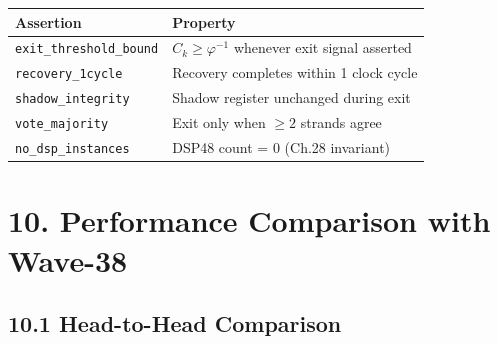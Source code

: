 \begin{longtable}[]{@{}
  >{\raggedright\arraybackslash}p{}
  >{\raggedright\arraybackslash}p{}@{}}
\toprule\noalign{}
Assertion & Property \\
\midrule\noalign{}
\endhead
\bottomrule\noalign{}
\endlastfoot
\texttt{exit\_threshold\_bound} & \(C_k \ge \varphi^{-1}\) whenever exit signal asserted \\
\texttt{recovery\_1cycle} & Recovery completes within 1 clock cycle \\
\texttt{shadow\_integrity} & Shadow register unchanged during exit \\
\texttt{vote\_majority} & Exit only when \(\ge 2\) strands agree \\
\texttt{no\_dsp\_instances} & DSP48 count = 0 (Ch.28 invariant) \\
\end{longtable}

\section{10. Performance Comparison with Wave-38}

\subsection{10.1 Head-to-Head Comparison}

